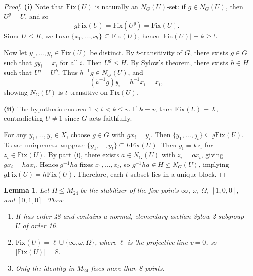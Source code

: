 \documentclass[12pt,a4paper,openany]{book}
\newtheorem{lemma}{Lemma}[section]
\newcommand{\Fix}{\mathrm{Fix}}
\begin{document}
\begin{proof}
\textbf{(i)} Note that $\Fix(U)$ is naturally an $N_G(U)$-set: if $g \in N_G(U)$, then $U^g = U$, and so
\[
g \Fix(U) = \Fix(U^g) = \Fix(U).
\] 
Since $U \le H$, we have $\{x_1, \dots, x_t\} \subseteq \Fix(U)$, hence $|\Fix(U)| = k \ge t$.  

Now let $y_1, \dots, y_t \in \Fix(U)$ be distinct. By $t$-transitivity of $G$, there exists $g \in G$ such that $g y_i = x_i$ for all $i$. Then $U^g \le H$. By Sylow's theorem, there exists $h \in H$ such that $U^g = U^h$. Thus $h^{-1}g \in N_G(U)$, and
\[
(h^{-1} g) y_i = h^{-1} x_i = x_i,
\]
showing $N_G(U)$ is $t$-transitive on $\Fix(U)$.

\medskip
\textbf{(ii)} The hypothesis ensures $1 < t < k \le v$. If $k=v$, then $\Fix(U) = X$, contradicting $U \neq 1$ since $G$ acts faithfully.  

For any $y_1, \dots, y_t \in X$, choose $g \in G$ with $g x_i = y_i$. Then $\{y_1, \dots, y_t\} \subseteq g \Fix(U)$. To see uniqueness, suppose $\{y_1, \dots, y_t\} \subseteq h \Fix(U)$. Then $y_i = h z_i$ for $z_i \in \Fix(U)$. By part (i), there exists $a \in N_G(U)$ with $z_i = a x_i$, giving $g x_i = h a x_i$. Hence $g^{-1} h a$ fixes $x_1, \dots, x_t$, so $g^{-1} h a \in H \le N_G(U)$, implying $g \Fix(U) = h \Fix(U)$. Therefore, each $t$-subset lies in a unique block.
\end{proof}

\begin{lemma}\label{lem:M24-stabilizer}
Let $H \le M_{24}$ be the stabilizer of the five points $\infty$, $\omega$, $\Omega$, $[1,0,0]$, and $[0,1,0]$. Then:
\begin{enumerate}[label=(\roman*)]
    \item $H$ has order 48 and contains a normal, elementary abelian Sylow 2-subgroup $U$ of order 16.
    \item $\Fix(U) = \ell \cup \{\infty, \omega, \Omega\}$, where $\ell$ is the projective line $v=0$, so $|\Fix(U)| = 8$.
    \item Only the identity in $M_{24}$ fixes more than 8 points.
\end{enumerate}
\end{lemma}
\end{document}
